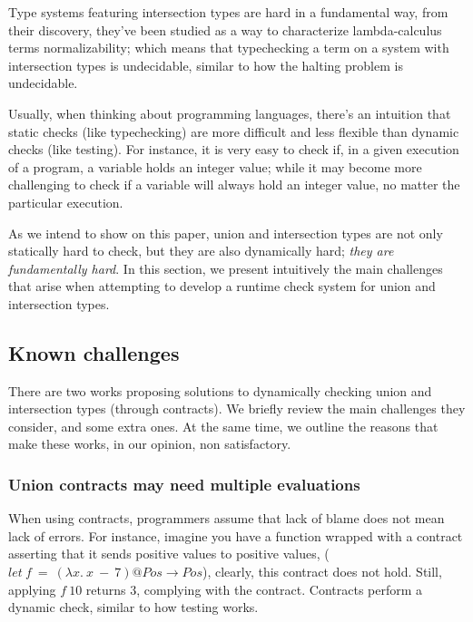 \newcommand{\moral}[1]{\noindent $\hookrightarrow$ \textsc{#1}}

Type systems featuring intersection types are hard in a fundamental way,
from their discovery, they've been studied as a way to characterize
lambda-calculus terms normalizability; which means that typechecking a
term on a system with intersection types is undecidable,
similar to how the halting problem is undecidable.

Usually, when thinking about programming languages, there's an intuition
that static checks (like typechecking) are more difficult and less flexible
than dynamic checks (like testing). For instance, it is very easy to check if,
in a given execution of a program, a variable holds an integer value; while it
may become more challenging to check if a variable will always hold an integer value,
no matter the particular execution.

As we intend to show on this paper, union and intersection types are not only
statically hard to check, but they are also dynamically hard;
\emph{they are fundamentally hard}.
In this section, we present intuitively the main challenges that arise
when attempting to develop a runtime check system for union and intersection types.

\subsection{Known challenges}

There are two works proposing solutions to dynamically checking union and intersection
types (through contracts). 
We briefly review the main challenges they consider, and some extra ones.
At the same time, we outline the reasons that make these works,
in our opinion, non satisfactory.


\subsubsection*{Union contracts may need multiple evaluations}

When using contracts, programmers assume that lack of blame does not mean
lack of errors.
For instance, imagine you have a function
wrapped with a contract asserting that it sends positive values to positive values,
($let~f~=~(\lambda x.~x~-~7)@Pos \rightarrow Pos$), clearly, this contract
does not hold.
Still, applying $f~10$ returns $3$, complying with the contract.
Contracts perform a dynamic check, similar to how testing works.

